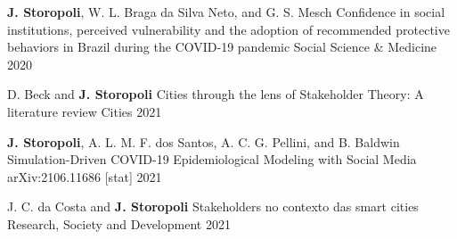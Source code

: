 

\begin{cventries}

  \cventry
    {\textbf{J. Storopoli}, W. L. Braga da Silva Neto, and G. S. Mesch} %
    {Confidence in social institutions, perceived vulnerability and the adoption of recommended protective behaviors in Brazil during the COVID-19 pandemic} %
    {Social Science \& Medicine} %
    {2020} %
    {}

  \cventry
    {D. Beck and \textbf{J. Storopoli}} %
    {Cities through the lens of Stakeholder Theory: A literature review} %
    {Cities} %
    {2021} %

  \cventry
    {\textbf{J. Storopoli}, A. L. M. F. dos Santos, A. C. G. Pellini, and B. Baldwin} %
    {Simulation-Driven COVID-19 Epidemiological Modeling with Social Media} %
    {arXiv:2106.11686 [stat]} %
    {2021} %

  \cventry
    {J. C. da Costa and \textbf{J. Storopoli}} %
    {Stakeholders no contexto das smart cities} %
    {Research, Society and Development} %
    {2021} %

\end{cventries}
